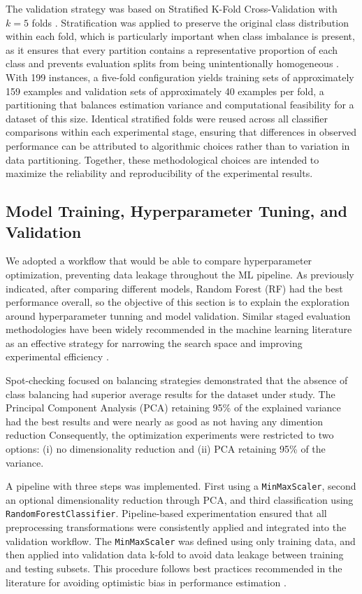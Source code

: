 The validation strategy was based on Stratified K-Fold Cross-Validation with $k = 5$
folds \cite{arlot2010crossvalidation}. Stratification was applied to preserve the original class
distribution within each fold, which is particularly important when class imbalance is present, as
it ensures that every partition contains a representative proportion of each class and prevents
evaluation splits from being unintentionally homogeneous \cite{faceli2011}. With 199 instances, a
five-fold configuration yields training sets of approximately 159 examples and validation sets of
approximately 40 examples per fold, a partitioning that balances estimation variance and
computational feasibility for a dataset of this size. Identical stratified folds were reused across
all classifier comparisons within each experimental stage, ensuring that differences in observed
performance can be attributed to algorithmic choices rather than to variation in data partitioning.
Together, these methodological choices are intended to maximize the reliability and
reproducibility of the experimental results.


\subsection{Model Training, Hyperparameter Tuning, and Validation}

We adopted a workflow that would be able to compare hyperparameter optimization, preventing data leakage throughout the ML pipeline.
As previously indicated, after comparing different models, Random Forest (RF) had the best performance overall, so the objective of this section is to explain the exploration around
hyperparameter tunning and model validation. Similar staged evaluation methodologies
have been widely recommended in the machine learning literature as an effective strategy for narrowing the search space and improving experimental
efficiency \cite{hastie2009elements, kuhn2013applied}.

Spot-checking focused on balancing strategies demonstrated that the absence of class
balancing had superior average results for the dataset under study.
The Principal Component Analysis (PCA) retaining 95\% of the explained variance had the best results and were nearly as good as not having any dimention reduction
Consequently, the optimization experiments were restricted to two options: (i) no dimensionality reduction and (ii) PCA retaining 95\% of the variance.

A pipeline with three steps was implemented. First using a \texttt{MinMaxScaler}, second an optional dimensionality reduction through PCA, and third classification using \texttt{RandomForestClassifier}.
Pipeline-based experimentation ensured that all preprocessing transformations were consistently applied and
 integrated into the validation workflow. The \texttt{MinMaxScaler} was defined using only training data, and then applied into validation data k-fold to avoid data leakage between training and testing subsets.
  This procedure follows best practices recommended in the literature for avoiding optimistic bias in performance estimation \cite{kaufman2012leakage, scikit-learn}.

